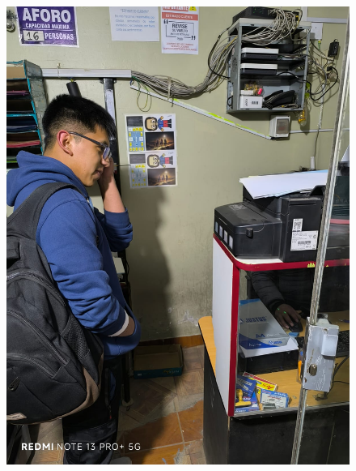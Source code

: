 \documentclass[12pt]{article}
\begin{document}
\begin{figure}[htbp]
\begin{minipage}[b]{0.48\textwidth}
\end{minipage}
\hfill
\begin{minipage}[b]{0.48\textwidth}
  \centering
  \includegraphics[width=\textwidth]{7.jpeg}
  
\end{minipage}

\vspace{1cm}
\end{figure}
\end{document}
